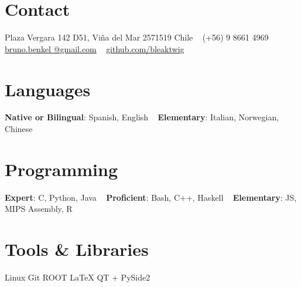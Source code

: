 \documentclass[a4paper]{cv-style}
\begin{document}
\lastupdated

\begin{aside}
    \section{Contact}
        Plaza Vergara 142 D51,
        Vi\~na del Mar 2571519
        Chile
        ~
        (+56) 9 8661 4969
        ~
        \href{mailto:bruno.benkel@gmail.com}{bruno.benkel
        @gmail.com}
        ~
        \href{https://github.com/bleaktwig}{github.com/bleaktwig}
    \section{Languages}
        \textbf{Native or Bilingual}:
        Spanish, English
        ~
        \textbf{Elementary}:
        Italian, Norwegian, Chinese
    \section{Programming}
        \textbf{Expert}:
        C, Python, Java
        ~
        \textbf{Proficient}:
        Bash, C++, Haskell
        ~
        \textbf{Elementary}:
        JS, MIPS Assembly, R
    \section{Tools \& Libraries}
        Linux
        Git
        ROOT
        \LaTeX{}
        QT + PySide2
\end{aside}

\end{document}
